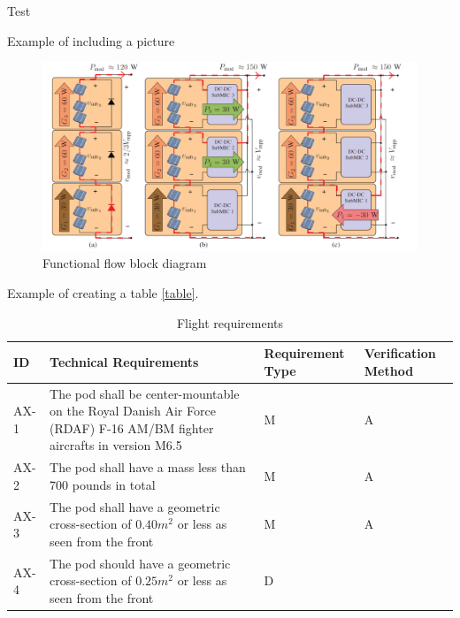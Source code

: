 Test

Example of including a picture
\begin{figure}[htbp]
	\includegraphics[width=\linewidth]{../Pictures/test.png}
	\caption{Functional flow block diagram}
	\label{fig:TimePlan}
\end{figure}

Example of creating a table \ref{table}.
\begin{table}[htbp]
	\begin{tabular}{|m{1.5cm}|m{8cm}|m{2.5cm}|m{2.5cm}|}
		\hline
		\rowcolor{lightgray} \textbf{ID} & \textbf{Technical Requirements}  & \textbf{Requirement Type}  &  \textbf{Verification Method}    \\ \hline
		AX-1 & The pod shall be center-mountable on the Royal Danish Air Force (RDAF) F-16 AM/BM fighter aircrafts in version M6.5     & M   & A      \\ \hline
		\rowcolor{Seashell2} AX-2 & The pod shall have a mass less than 700 pounds in total & M  & A        \\ \hline
		AX-3 & The pod shall have a geometric cross-section of $0.40m^2$  or less as seen from the front   &  M   & A                \\ \hline
		\rowcolor{Seashell2} AX-4 & The pod should have a geometric cross-section of $0.25m^2$ or less as seen from the front   &  D   &                \\ \hline
	\end{tabular}
	\caption{Flight requirements}
	\label{tab:TechRequirements}
\end{table}

